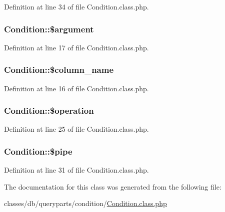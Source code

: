 Definition at line 34 of file Condition.\-class.\-php.

\hypertarget{classCondition_ab2171308c722d4d35f37369762d78175}{
\subsubsection[{\$argument}]{\setlength{\rightskip}{0pt plus 5cm}Condition\-::\$argument}}\label{classCondition_ab2171308c722d4d35f37369762d78175}


Definition at line 17 of file Condition.\-class.\-php.

\hypertarget{classCondition_ae34f9b605299c7142f5c9daa61b338fe}{
\subsubsection[{\$column\-\_\-name}]{\setlength{\rightskip}{0pt plus 5cm}Condition\-::\$column\-\_\-name}}\label{classCondition_ae34f9b605299c7142f5c9daa61b338fe}


Definition at line 16 of file Condition.\-class.\-php.

\hypertarget{classCondition_aa8fbf3bdbbea0c57d3822ac585eb75a4}{
\subsubsection[{\$operation}]{\setlength{\rightskip}{0pt plus 5cm}Condition\-::\$operation}}\label{classCondition_aa8fbf3bdbbea0c57d3822ac585eb75a4}


Definition at line 25 of file Condition.\-class.\-php.

\hypertarget{classCondition_a19b2472b462fc19e44b8fcbf1898b9cc}{
\subsubsection[{\$pipe}]{\setlength{\rightskip}{0pt plus 5cm}Condition\-::\$pipe}}\label{classCondition_a19b2472b462fc19e44b8fcbf1898b9cc}


Definition at line 31 of file Condition.\-class.\-php.



The documentation for this class was generated from the following file\-:\begin{DoxyCompactItemize}
\item 
classes/db/queryparts/condition/\hyperlink{Condition_8class_8php}{Condition.\-class.\-php}\end{DoxyCompactItemize}
